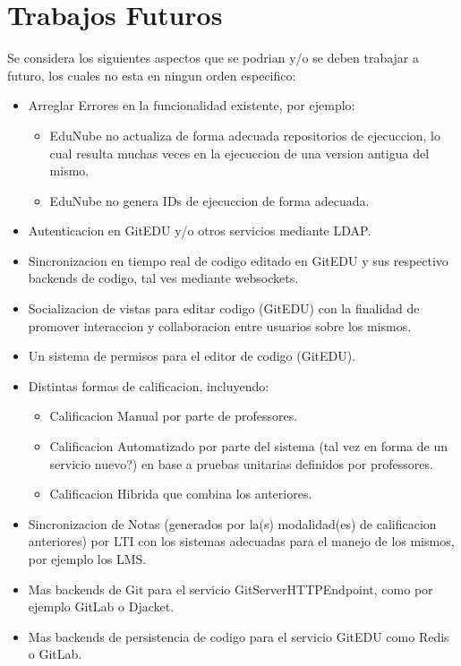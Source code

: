 \section{Trabajos Futuros}
Se considera los siguientes aspectos que se podrian y/o se deben trabajar a futuro, los cuales no esta en ningun orden especifico:
\begin{itemize}
	\item Arreglar Errores en la funcionalidad existente, por ejemplo:
    \begin{itemize}
    	\item EduNube no actualiza de forma adecuada repositorios de ejecuccion, lo cual resulta muchas veces en la ejecuccion de una version antigua del mismo.
        \item EduNube no genera IDs de ejecuccion de forma adecuada.
    \end{itemize}
    \item Autenticacion en GitEDU y/o otros servicios mediante LDAP.
    \item Sincronizacion en tiempo real de codigo editado en GitEDU y sus respectivo backends de codigo, tal ves mediante websockets.
    \item Socializacion de vistas para editar codigo (GitEDU) con la finalidad de promover interaccion y collaboracion entre usuarios sobre los mismos.
    \item Un sistema de permisos para el editor de codigo (GitEDU).
    \item Distintas formas de calificacion, incluyendo:
    \begin{itemize}
    	\item Calificacion Manual por parte de professores.
        \item Calificacion Automatizado por parte del sistema (tal vez en forma de un servicio nuevo?) en base a pruebas unitarias definidos por professores.
        \item Calificacion Hibrida que combina los anteriores.
    \end{itemize}
    \item Sincronizacion de Notas (generados por la(s) modalidad(es) de calificacion anteriores) por LTI con los sistemas adecuadas para el manejo de los mismos, por ejemplo los LMS.
    \item Mas backends de Git para el servicio GitServerHTTPEndpoint, como por ejemplo GitLab o Djacket.
    \item Mas backends de persistencia de codigo para el servicio GitEDU como Redis o GitLab.

\end{itemize}

